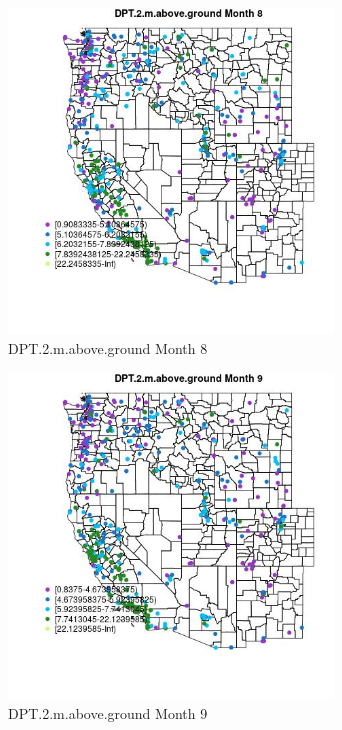 \begin{figure} 
\centering  
\includegraphics[width=0.77\textwidth]{Code_Outputs/ML_input_report_ML_input_PM25_Step5_part_d_de_duplicated_aves_ML_input_MapObsMo8DPT2maboveground.jpg} 
\caption{\label{fig:ML_input_report_ML_input_PM25_Step5_part_d_de_duplicated_aves_ML_inputMapObsMo8DPT2maboveground}DPT.2.m.above.ground Month 8} 
\end{figure} 
 

\begin{figure} 
\centering  
\includegraphics[width=0.77\textwidth]{Code_Outputs/ML_input_report_ML_input_PM25_Step5_part_d_de_duplicated_aves_ML_input_MapObsMo9DPT2maboveground.jpg} 
\caption{\label{fig:ML_input_report_ML_input_PM25_Step5_part_d_de_duplicated_aves_ML_inputMapObsMo9DPT2maboveground}DPT.2.m.above.ground Month 9} 
\end{figure} 
 

